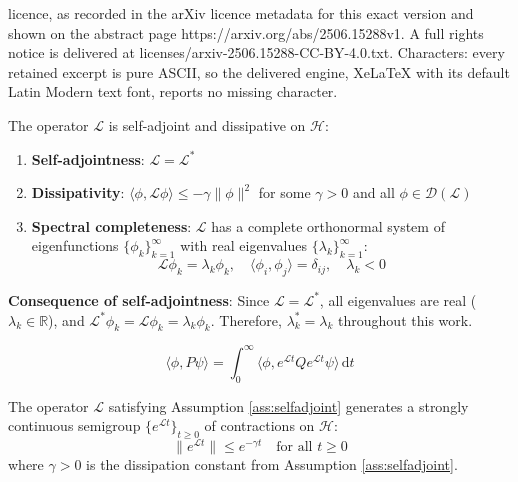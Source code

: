 \documentclass[10pt,a4paper]{amsart}
\def\H{\mathcal{H}}
\newcommand{\dd}{\,\mathrm{d}}
\newcommand{\inner}[2]{\langle #1, #2 \rangle}
\begin{document}
licence, as recorded in the arXiv licence metadata for this exact version and shown on the abstract page https://arxiv.org/abs/2506.15288v1. A full rights notice is delivered at licenses/arxiv-2506.15288-CC-BY-4.0.txt. Characters: every retained excerpt is pure ASCII, so the delivered engine, XeLaTeX with its default Latin Modern text font, reports no missing character.
\begin{assumption}\label{ass:selfadjoint}
The operator $\mathcal{L}$ is self-adjoint and dissipative on $\H$:
\begin{enumerate}
\item \textbf{Self-adjointness}: $\mathcal{L} = \mathcal{L}^*$
\item \textbf{Dissipativity}: $\inner{\phi}{\mathcal{L}\phi} \leq -\gamma \|\phi\|^2$ for some $\gamma > 0$ and all $\phi \in \mathcal{D}(\mathcal{L})$
\item \textbf{Spectral completeness}: $\mathcal{L}$ has a complete orthonormal system of eigenfunctions $\{\phi_k\}_{k=1}^{\infty}$ with real eigenvalues $\{\lambda_k\}_{k=1}^{\infty}$:
\begin{equation}
\mathcal{L}\phi_k = \lambda_k \phi_k, \quad \inner{\phi_i}{\phi_j} = \delta_{ij}, \quad \lambda_k < 0
\end{equation}
\end{enumerate}
\textbf{Consequence of self-adjointness}: Since $\mathcal{L} = \mathcal{L}^*$, all eigenvalues are real ($\lambda_k \in \mathbb{R}$), and $\mathcal{L}^*\phi_k = \mathcal{L}\phi_k = \lambda_k \phi_k$. Therefore, $\lambda_k^* = \lambda_k$ throughout this work.
\end{assumption}

\begin{equation}\label{eq:energy_integral}
\inner{\phi}{P\psi} = \int_0^{\infty} \inner{\phi}{e^{\mathcal{L}t} Q e^{\mathcal{L}t} \psi} \dd t
\end{equation}

\begin{assumption}\label{ass:semigroup}
The operator $\mathcal{L}$ satisfying Assumption \ref{ass:selfadjoint} generates a strongly continuous semigroup $\{e^{\mathcal{L}t}\}_{t \geq 0}$ of contractions on $\H$:
\begin{equation}
\|e^{\mathcal{L}t}\| \leq e^{-\gamma t} \quad \text{for all } t \geq 0
\end{equation}
where $\gamma > 0$ is the dissipation constant from Assumption \ref{ass:selfadjoint}.
\end{assumption}
\end{document}

